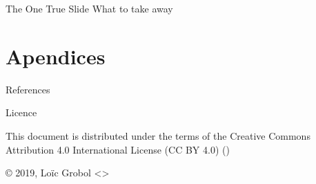 \documentclass[hyperref={unicode}, xcolor={svgnames}, french]{beamer}
\title{\titlepagetitle}
\author{\myname}
\institute{\mylab}
\date{\conference\\\confplace, \confdate}
\begin{document}

\begin{frame}[plain]
	\titlepage
\end{frame}


\begin{frame}{The One True Slide}
	What to take away
\end{frame}


\appendix
\section{Apendices}

\begin{frame}[allowframebreaks]{References}
	\printbibliography[heading=none]
\end{frame}

\begin{frame}{Licence}
	\begin{center}
		{\huge \ccby}
		\vfill
		This document is distributed under the terms of the Creative Commons Attribution 4.0 International License (CC BY 4.0) ()

		\vfill
		© 2019, Loïc Grobol <>

	\end{center}
\end{frame}
\end{document}
